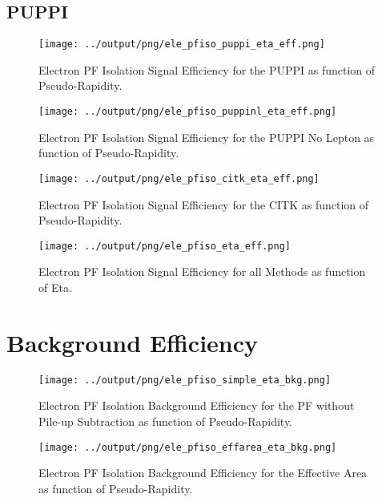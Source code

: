 \documentclass[11pt]{book}
\begin{document}
\section{PUPPI}
\begin{figure}[htb]
\centering
\texttt{[image: ../output/png/ele\_pfiso\_puppi\_eta\_eff.png]}
\caption{Electron PF Isolation Signal Efficiency for the PUPPI as function of Pseudo-Rapidity.}
\label{fig:ele_pfiso_eta_eff_puppi}
\end{figure}

\begin{figure}[htb]
\centering
\texttt{[image: ../output/png/ele\_pfiso\_puppinl\_eta\_eff.png]}
\caption{Electron PF Isolation Signal Efficiency for the PUPPI No Lepton as function of Pseudo-Rapidity.}
\label{fig:ele_pfiso_eta_eff_puppinl}
\end{figure}

\begin{figure}[htb]
\centering
\texttt{[image: ../output/png/ele\_pfiso\_citk\_eta\_eff.png]}
\caption{Electron PF Isolation Signal Efficiency for the CITK as function of Pseudo-Rapidity.}
\label{fig:ele_pfiso_eta_eff_citk}
\end{figure}

\begin{figure}[htb]
\centering
\texttt{[image: ../output/png/ele\_pfiso\_eta\_eff.png]}
\caption{Electron PF Isolation Signal Efficiency for all Methods as function of Eta.}
\label{fig:ele_pfiso_eta_eff}
\end{figure}
\clearpage

\chapter{Background Efficiency}
\begin{figure}[htb]
\centering
\texttt{[image: ../output/png/ele\_pfiso\_simple\_eta\_bkg.png]}
\caption{Electron PF Isolation Background Efficiency for the PF without Pile-up Subtraction as function of Pseudo-Rapidity.}
\label{fig:ele_pfiso_eta_bkg_simple}
\end{figure}

\begin{figure}[htb]
\centering
\texttt{[image: ../output/png/ele\_pfiso\_effarea\_eta\_bkg.png]}
\caption{Electron PF Isolation Background Efficiency for the Effective Area as function of Pseudo-Rapidity.}
\label{fig:ele_pfiso_eta_bkg_effarea}
\end{figure}
\end{document}
